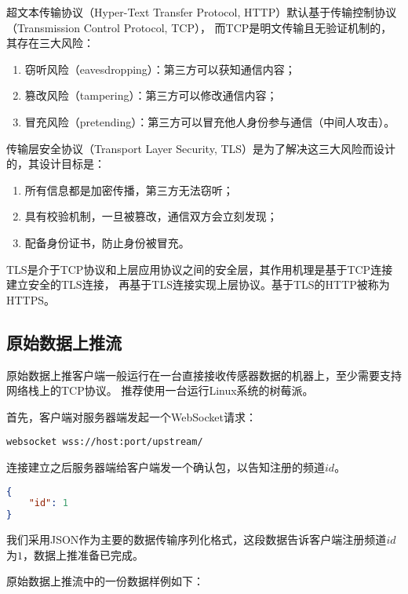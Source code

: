 超文本传输协议\cite{rfc7230}（Hyper-Text Transfer Protocol, HTTP）默认基于传输控制协议\cite{rfc793}（Transmission Control Protocol, TCP），
而TCP是明文传输且无验证机制的，其存在三大风险：

\begin{enumerate}
    \item 窃听风险（eavesdropping）：第三方可以获知通信内容；
    \item 篡改风险（tampering）：第三方可以修改通信内容；
    \item 冒充风险（pretending）：第三方可以冒充他人身份参与通信（中间人攻击）。
\end{enumerate}

传输层安全协议\cite{rfc8446}（Transport Layer Security, TLS）是为了解决这三大风险而设计的，其设计目标是：

\begin{enumerate}
    \item 所有信息都是加密传播，第三方无法窃听；
    \item 具有校验机制，一旦被篡改，通信双方会立刻发现；
    \item 配备身份证书，防止身份被冒充。
\end{enumerate}

TLS是介于TCP协议和上层应用协议之间的安全层，其作用机理是基于TCP连接建立安全的TLS连接，
再基于TLS连接实现上层协议。基于TLS的HTTP被称为HTTPS。

\subsection{原始数据上推流}

原始数据上推客户端一般运行在一台直接接收传感器数据的机器上，至少需要支持网络栈上的TCP协议。
推荐使用一台运行Linux系统的树莓派。

首先，客户端对服务器端发起一个WebSocket请求：

\begin{lstlisting}
websocket wss://host:port/upstream/
\end{lstlisting}

连接建立之后服务器端给客户端发一个确认包，以告知注册的频道$id$。

\begin{lstlisting}[language=json,firstnumber=1]
{
    "id": 1
}
\end{lstlisting}

我们采用JSON作为主要的数据传输序列化格式，这段数据告诉客户端注册频道$id$为$1$，数据上推准备已完成。

原始数据上推流中的一份数据样例如下：

